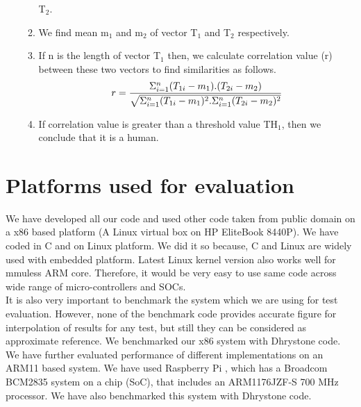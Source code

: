 \begin{enumerate}
\begin{enumerate}
T$_2$.
\item We find mean m$_1$ and m$_2$ of vector T$_1$ and T$_2$ respectively.
\item If n is the length of vector T$_1$ then, we calculate correlation
value (r) between these two vectors to find similarities as follows.
	\begin{equation}
	r = {{\Sigma ^n _{i = 1}(T_{1i} - m_1) . (T_{2i} - m_2)}
\over {\sqrt {\Sigma ^n _{i = 1} (T_{1i} - m_1)^2 . \Sigma ^n _{i = 1} (T_{2i}
- m_2)^2}}}
	\end{equation}
\item If correlation value is greater than a threshold value TH$_1$,
then we conclude that it is a human.
\end{enumerate} 
\end{enumerate} 
\section {Platforms used for evaluation}
\indent We have developed all our code and used other code taken from
public domain on a x86 based platform (A Linux virtual box on HP
EliteBook 8440P). We have coded in C and on Linux platform. We did it so
because, C and Linux are widely used with embedded platform. Latest
Linux kernel version also works well for mmuless ARM core. Therefore, it
would be very easy to use same code across wide range of
micro-controllers and SOCs.\\
\indent It is also very important to benchmark the system which we are
using for test evaluation. However, none of the benchmark code provides
accurate figure for interpolation of results for any test, but still
they can be considered as approximate reference. We benchmarked our x86
system with Dhrystone code.\\
\indent We have further evaluated performance of different
implementations on an ARM11 based system. We have used Raspberry Pi ,
which has a Broadcom BCM2835 system on a chip (SoC), that includes an
ARM1176JZF-S 700 MHz processor. We have also benchmarked this system
with Dhrystone code.

